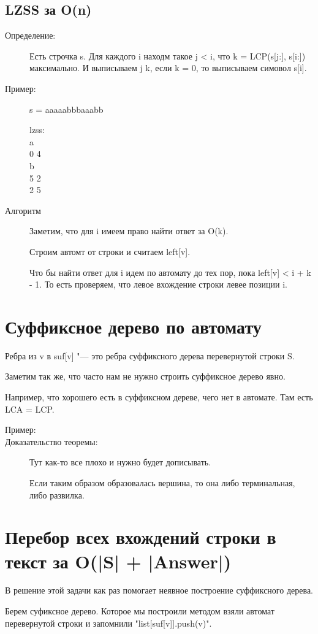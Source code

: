 \subsection{LZSS за O(n)}
    \begin{description}
    \item[Определение:] 
    Есть строчка s. Для каждого i находм такое j < i,
    что k = LCP(s[j:], s[i:]) максимально. И
    выписываем j k, если k = 0, то выписываем симовол s[i].
    \item[Пример:]
    s = aaaaabbbaaabb

    lzss:\\
    a\\
    0 4\\
    b\\
    5 2\\
    2 5\\
    
    \item[Алгоритм]
    Заметим, что для i имеем право найти ответ за O(k).

    Строим автомт от строки и считаем left[v]. 

    Что бы найти ответ для i идем по автомату до тех 
    пор, пока left[v] < i + k - 1. То есть проверяем, 
    что левое вхождение строки левее позиции i.
    \end{description}
\section{Суффиксное дерево по автомату}
    \begin{theorem}
    Ребра из v в suf[v] "--- это ребра суффиксного дерева перевернутой 
    строки S.
    \end{theorem}

    Заметим так же, что часто нам не нужно 
    строить суффиксное дерево явно. 

    Например, что хорошего есть в суффиксном дереве, чего нет 
    в автомате. Там есть LCA = LCP. 

    \begin{description}
    \item[Пример:]

    \item[Доказательство теоремы:]
    Тут как-то все плохо и нужно будет дописывать. 

    Если таким образом образовалась вершина, то она либо терминальная, 
    либо развилка.
    \end{description}

\section{Перебор всех вхождений строки в текст за O(|S| + |Answer|)}
В решение этой задачи как раз помогает неявное построение суффиксного дерева.

Берем суфиксное дерево. Которое мы построили методом взяли автомат
перевернутой строки и запомнили \cpp"list[suf[v]].push(v)".  